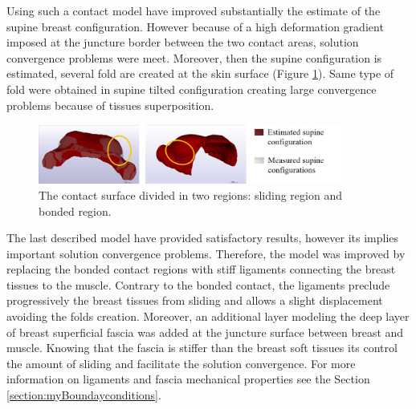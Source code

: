 Using such a contact model have improved substantially the estimate of the supine breast configuration. However because of a high deformation gradient imposed at the juncture border between the two contact areas, solution convergence problems were meet. Moreover, then the supine configuration is estimated, several fold are created at the skin surface (Figure \ref{fig:mistcontactresults}). Same type of fold were obtained in supine tilted configuration creating large convergence problems because of tissues superposition.

\begin{figure}[!h]
\centering
\includegraphics[width=0.9\textwidth,keepaspectratio]{figures/mixt_contact_supine.jpg} 
\caption{The contact surface divided in two regions: sliding region and bonded region.}
\label{fig:mistcontactresults}
\end{figure}

The last described model have provided satisfactory results, however its implies important solution convergence problems. Therefore, the model was improved by replacing the bonded contact regions with stiff ligaments connecting the breast tissues to the muscle.  Contrary to the bonded contact, the ligaments preclude progressively the breast tissues from sliding and allows a slight displacement avoiding the folds creation. Moreover, an additional layer modeling the deep layer of breast superficial fascia was added at the juncture surface between breast and muscle. Knowing that the fascia is stiffer than the breast soft tissues its control the amount of sliding and facilitate the solution convergence. For more information on ligaments and fascia mechanical properties see the Section \ref{section:myBoundayconditions}.